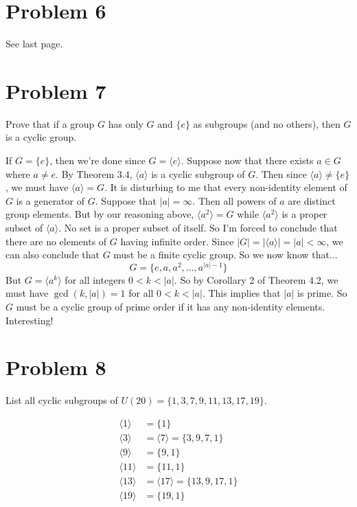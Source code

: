 \documentclass{article}
\begin{document}
\section*{Problem 6}

See last page.

\section*{Problem 7}

Prove that if a group $G$ has only $G$ and $\{e\}$ as subgroups (and no others),
then $G$ is a cyclic group.

If $G=\{e\}$, then we're done since $G=\langle e\rangle$.
Suppose now that there exists $a\in G$ where $a\neq e$.
By Theorem 3.4, $\langle a\rangle$ is a cyclic subgroup of $G$.
Then since $\langle a\rangle\neq\{e\}$, we must have $\langle a\rangle=G$.
It is disturbing to me that every non-identity element of $G$ is a
generator of $G$.  Suppose that $|a|=\infty$.  Then all powers of $a$
are distinct group elements.  But by our reasoning above, $\langle a^2\rangle =G$
while $\langle a^2\rangle$ is a proper subset of $\langle a\rangle$.  No set is
a proper subset of itself.  So I'm forced to conclude that there are no elements
of $G$ having infinite order.  Since $|G|=|\langle a\rangle|=|a|<\infty$, we can also
conclude that $G$ must be a finite cyclic group.  So we now know that...
\begin{equation*}
G = \{e,a,a^2,\dots,a^{|a|-1}\}
\end{equation*}
But $G=\langle a^k\rangle$ for all integers $0<k<|a|$.  So by Corollary 2 of Theorem 4.2,
we must have $\gcd(k,|a|)=1$ for all $0<k<|a|$.  This implies that $|a|$ is prime.
So $G$ must be a cyclic group of prime order if it has any non-identity elements.
Interesting!

\section*{Problem 8}

List all cyclic subgroups of $U(20)=\{1,3,7,9,11,13,17,19\}$.

\begin{align*}
\langle 1\rangle &= \{1\} \\
\langle 3\rangle &= \langle 7\rangle = \{3,9,7,1\} \\
\langle 9\rangle &= \{9,1\} \\
\langle 11\rangle &= \{11,1\} \\
\langle 13\rangle &= \langle 17\rangle = \{13, 9, 17, 1\} \\
\langle 19\rangle &= \{19, 1\}
\end{align*}
\end{document}
